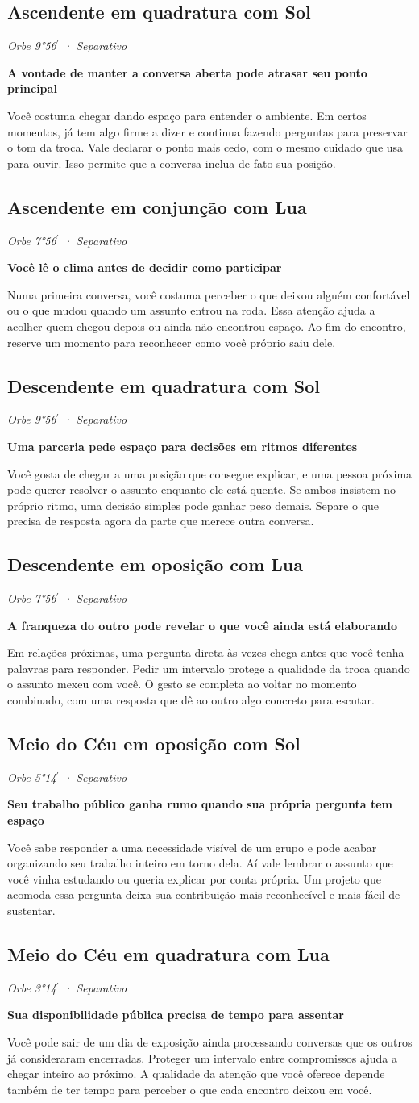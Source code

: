 \documentclass[11pt,a4paper]{article}
\newcommand{\leitura}[3]{\subsection{#1}\textit{#2}\par #3}
\newcommand{\subtituloleitura}[1]{\textbf{#1}\par\nopagebreak[4]}
\begin{document}
\leitura{Ascendente em quadratura com Sol}{Orbe 9°56\ensuremath{^{\prime}} · Separativo}{
\subtituloleitura{A vontade de manter a conversa aberta pode atrasar seu ponto principal}
Você costuma chegar dando espaço para entender o ambiente. Em certos momentos, já tem algo firme a dizer e continua fazendo perguntas para preservar o tom da troca. Vale declarar o ponto mais cedo, com o mesmo cuidado que usa para ouvir. Isso permite que a conversa inclua de fato sua posição.
}

\leitura{Ascendente em conjunção com Lua}{Orbe 7°56\ensuremath{^{\prime}} · Separativo}{
\subtituloleitura{Você lê o clima antes de decidir como participar}
Numa primeira conversa, você costuma perceber o que deixou alguém confortável ou o que mudou quando um assunto entrou na roda. Essa atenção ajuda a acolher quem chegou depois ou ainda não encontrou espaço. Ao fim do encontro, reserve um momento para reconhecer como você próprio saiu dele.
}

\leitura{Descendente em quadratura com Sol}{Orbe 9°56\ensuremath{^{\prime}} · Separativo}{
\subtituloleitura{Uma parceria pede espaço para decisões em ritmos diferentes}
Você gosta de chegar a uma posição que consegue explicar, e uma pessoa próxima pode querer resolver o assunto enquanto ele está quente. Se ambos insistem no próprio ritmo, uma decisão simples pode ganhar peso demais. Separe o que precisa de resposta agora da parte que merece outra conversa.
}

\leitura{Descendente em oposição com Lua}{Orbe 7°56\ensuremath{^{\prime}} · Separativo}{
\subtituloleitura{A franqueza do outro pode revelar o que você ainda está elaborando}
Em relações próximas, uma pergunta direta às vezes chega antes que você tenha palavras para responder. Pedir um intervalo protege a qualidade da troca quando o assunto mexeu com você. O gesto se completa ao voltar no momento combinado, com uma resposta que dê ao outro algo concreto para escutar.
}

\leitura{Meio do Céu em oposição com Sol}{Orbe 5°14\ensuremath{^{\prime}} · Separativo}{
\subtituloleitura{Seu trabalho público ganha rumo quando sua própria pergunta tem espaço}
Você sabe responder a uma necessidade visível de um grupo e pode acabar organizando seu trabalho inteiro em torno dela. Aí vale lembrar o assunto que você vinha estudando ou queria explicar por conta própria. Um projeto que acomoda essa pergunta deixa sua contribuição mais reconhecível e mais fácil de sustentar.
}

\leitura{Meio do Céu em quadratura com Lua}{Orbe 3°14\ensuremath{^{\prime}} · Separativo}{
\label{aspecto:mc-lua}\subtituloleitura{Sua disponibilidade pública precisa de tempo para assentar}
Você pode sair de um dia de exposição ainda processando conversas que os outros já consideraram encerradas. Proteger um intervalo entre compromissos ajuda a chegar inteiro ao próximo. A qualidade da atenção que você oferece depende também de ter tempo para perceber o que cada encontro deixou em você.
}
\end{document}
